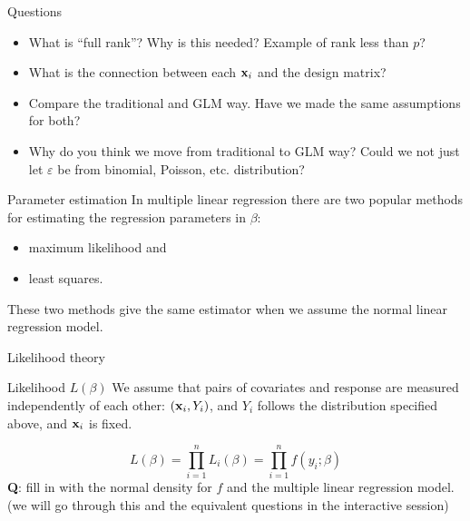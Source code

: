 \documentclass[
  ignorenonframetext,
]{beamer}
\providecommand{\tightlist}{%
  \setlength{\itemsep}{0pt}\setlength{\parskip}{0pt}}
\begin{document}
\begin{frame}
\begin{block}{Questions}
\protect{}\label{questions}
\begin{itemize}
\tightlist
\item
  What is ``full rank''? Why is this needed? Example of rank less than
  \(p\)?
\item
  What is the connection between each \({\bf x}_i\) and the design
  matrix?
\item
  Compare the traditional and GLM way. Have we made the same assumptions
  for both?
\item
  Why do you think we move from traditional to GLM way? Could we not
  just let \(\varepsilon\) be from binomial, Poisson, etc. distribution?
\end{itemize}
\end{block}
\end{frame}

\begin{frame}{Parameter estimation}
\protect{}\label{parameter-estimation}
In multiple linear regression there are two popular methods for
estimating the regression parameters in \(\beta\):

\begin{itemize}
\tightlist
\item
  maximum likelihood and
\item
  least squares.
\end{itemize}

These two methods give the same estimator when we assume the normal
linear regression model.
\end{frame}

\begin{frame}
\begin{block}{Likelihood theory}
\protect{}\label{likelihood-theory}
\begin{block}{Likelihood \(L(\beta)\)}
\protect{}\label{likelihood-lbeta}
We assume that pairs of covariates and response are measured
independently of each other: \(({\bf x}_i,Y_i)\), and \(Y_i\) follows
the distribution specified above, and \({\bf x}_i\) is fixed.

\[L(\beta)=\prod_{i=1}^n L_i(\beta)=\prod_{i=1}^n f(y_i; \beta)\]
\textbf{Q}: fill in with the normal density for \(f\) and the multiple
linear regression model. (we will go through this and the equivalent
questions in the interactive session)
\end{block}
\end{block}
\end{frame}
\end{document}
